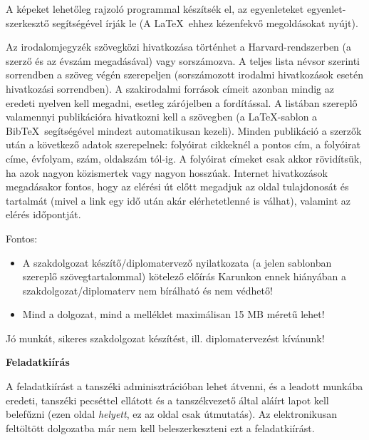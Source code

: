 A képeket lehetőleg rajzoló programmal készítsék el, az egyenleteket
egyenlet-szerkesztő segítségével írják le (A \LaTeX~ehhez kézenfekvő
megoldásokat nyújt).

Az irodalomjegyzék szövegközi hivatkozása történhet a
Harvard-rendszerben (a szerző és az évszám megadásával) vagy
sorszámozva. A teljes lista névsor szerinti sorrendben a szöveg végén
szerepeljen (sorszámozott irodalmi hivatkozások esetén hivatkozási
sorrendben). A szakirodalmi források címeit azonban mindig az eredeti
nyelven kell megadni, esetleg zárójelben a fordítással. A listában
szereplő valamennyi publikációra hivatkozni kell a szövegben (a
\LaTeX-sablon a Bib\TeX~segítségével mindezt automatikusan kezeli).
Minden publikáció a szerzők után a következő adatok szerepelnek:
folyóirat cikkeknél a pontos cím, a folyóirat címe, évfolyam, szám,
oldalszám tól-ig. A folyóirat címeket csak akkor rövidítsük, ha azok
nagyon közismertek vagy nagyon hosszúak. Internet hivatkozások
megadásakor fontos, hogy az elérési út előtt megadjuk az oldal
tulajdonosát és tartalmát (mivel a link egy idő után akár elérhetetlenné
is válhat), valamint az elérés időpontját.

Fontos:

\begin{itemize}
\itemsep1pt\parskip0pt
\item
  A szakdolgozat készítő/diplomatervező nyilatkozata (a jelen sablonban
  szereplő szövegtartalommal) kötelező előírás Karunkon ennek hiányában
  a szakdolgozat/diplomaterv nem bírálható és nem védhető!
\item
  Mind a dolgozat, mind a melléklet maximálisan 15 MB méretű lehet!
\end{itemize}

Jó munkát, sikeres szakdolgozat készítést, ill. diplomatervezést
kívánunk!

\clearpage

\textbf{Feladatkiírás}

A feladatkiírást a tanszéki adminisztrációban lehet átvenni, és a
leadott munkába eredeti, tanszéki pecséttel ellátott és a tanszékvezető
által aláírt lapot kell belefűzni (ezen oldal \emph{helyett}, ez az
oldal csak útmutatás). Az elektronikusan feltöltött dolgozatba már nem
kell beleszerkeszteni ezt a feladatkiírást.
